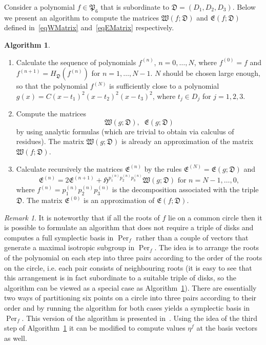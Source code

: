 \documentclass{amsart}
\numberwithin{equation}{section}
\theoremstyle{definition}
\newtheorem{algo}{Algorithm}[section]
\theoremstyle{remark}
\newtheorem*{remark}{Remark}
\DeclareMathOperator{\Per}{Per}
\begin{document}
	Consider a polynomial $f \in \mathfrak P_6$ that is subordinate to $\mathfrak D = (D_1,D_2,D_3)$. Below we present an algorithm to compute the matrices $\mathfrak W(f;\mathfrak D)$ and $\mathfrak E(f;\mathfrak D)$ defined in~\eqref{eqWMatrix} and~\eqref{eqEMatrix} respectively.
	
	\begin{algo}\label{algPeriods}
		\begin{enumerate}
			\item Calculate the sequence of polynomials $f^{(n)}$, $n = 0, \dots, N$, where $f^{(0)} = f$ and $f^{(n+1)} = H_{\mathfrak D}(f^{(n)})$ for $n = 1, \dots, N-1$. $N$ should be chosen large enough, so that the polynomial $f^{(N)}$ is sufficiently close to a polynomial $g(x) = C(x - t_1)^2(x - t_2)^2(x - t_3)^2$, where $t_j \in D_j$ for $j = 1,2,3$.
			\item Compute the matrices 
			\[ \mathfrak W(g; \mathfrak D),\;\; \mathfrak E(g;\mathfrak D)\]
			by using analytic formulas (which are trivial to obtain via calculus of residues). The matrix $\mathfrak W(g; \mathfrak D)$ is already an approximation of the matrix $\mathfrak W(f;\mathfrak D)$.
			\item Calculate recursively the matrices $\mathfrak E^{(n)}$ by the rules $\mathfrak E^{(N)} = \mathfrak E(g;\mathfrak D)$ and
			\[
			\mathfrak E^{(n)} = 2\mathfrak E^{(n+1)} + \mathfrak H^{p_1^{(n)}p_2^{(n)}p_3^{(n)}} \mathfrak W(g;\mathfrak D) \text{ for } n = N-1,\dots,0,
			\]
			where $f^{(n)} = p_1^{(n)}p_2^{(n)}p_3^{(n)}$ is the decomposition associated with the triple $\mathfrak D$. The matrix $\mathfrak E^{(0)}$ is an approximation of $\mathfrak E(f;\mathfrak D)$.
		\end{enumerate}    
	\end{algo}
	
	\begin{remark}
		It is noteworthy that if all the roots of $f$ lie on a common circle then it is possible to formulate an algorithm that does not require a triple of disks and computes a full symplectic basis in $\Per_f$ rather than a couple of vectors that generate a maximal isotropic subgroup in $\Per_f$. The idea is to arrange the roots of the polynomial on each step into three pairs according to the order of the roots on the circle, i.e. each pair consists of neighbouring roots (it is easy to see that this arrangement is in fact subordinate to a suitable triple of disks, so the algorithm can be viewed as a special case as Algorithm~\ref{algPeriods}). There are essentially two ways of partitioning six points on a circle into three pairs according to their order and by running the algorithm for both cases yields a symplectic basis in $\Per_f$. This version of the algorithm is presented in~\cite{BostMestre}. Using the idea of the third step of Algorithm~\ref{algPeriods} it can be modified to compute values $\eta^f$ at the basis vectors as well.
	\end{remark}
	
\end{document}

